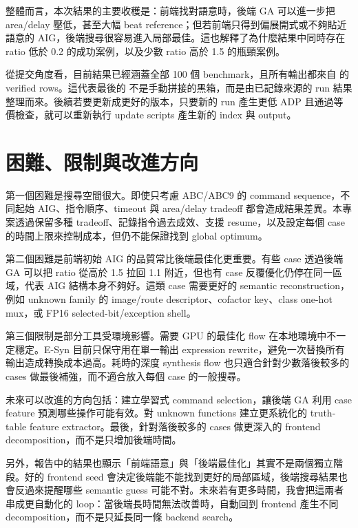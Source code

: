 \documentclass[UTF8,fontset=none,10pt,a4paper]{ctexart}
\newcommand{\code}[1]{\texttt{\detokenize{#1}}}
\begin{document}
整體而言，本次結果的主要收穫是：前端找對語意時，後端 GA 可以進一步把 area/delay 壓低，甚至大幅 beat reference；但若前端只得到偏展開式或不夠貼近語意的 AIG，後端搜尋很容易進入局部最佳。這也解釋了為什麼結果中同時存在 ratio 低於 0.2 的成功案例，以及少數 ratio 高於 1.5 的瓶頸案例。

從提交角度看，目前結果已經涵蓋全部 100 個 benchmark，且所有輸出都來自 \code{source_kind=run} 的 verified rows。這代表最後的 \code{output/} 不是手動拼接的黑箱，而是由已記錄來源的 run 結果整理而來。後續若要更新成更好的版本，只要新的 run 產生更低 ADP 且通過等價檢查，就可以重新執行 update scripts 產生新的 index 與 output。

\section{困難、限制與改進方向}

第一個困難是搜尋空間很大。即使只考慮 ABC/ABC9 的 command sequence，不同起始 AIG、指令順序、timeout 與 area/delay tradeoff 都會造成結果差異。本專案透過保留多種 tradeoff、記錄指令過去成效、支援 resume，以及設定每個 case 的時間上限來控制成本，但仍不能保證找到 global optimum。

第二個困難是前端初始 AIG 的品質常比後端最佳化更重要。有些 case 透過後端 GA 可以把 ratio 從高於 1.5 拉回 1.1 附近，但也有 case 反覆優化仍停在同一區域，代表 AIG 結構本身不夠好。這類 case 需要更好的 semantic reconstruction，例如 unknown family 的 image/route descriptor、cofactor key、class one-hot mux，或 FP16 selected-bit/exception shell。

第三個限制是部分工具受環境影響。需要 GPU 的最佳化 flow 在本地環境中不一定穩定。E-Syn 目前只保守用在單一輸出 expression rewrite，避免一次替換所有輸出造成轉換成本過高。耗時的深度 synthesis flow 也只適合針對少數落後較多的 cases 做最後補強，而不適合放入每個 case 的一般搜尋。

未來可以改進的方向包括：建立學習式 command selection，讓後端 GA 利用 case feature 預測哪些操作可能有效。對 unknown functions 建立更系統化的 truth-table feature extractor。最後，針對落後較多的 cases 做更深入的 frontend decomposition，而不是只增加後端時間。

另外，報告中的結果也顯示「前端語意」與「後端最佳化」其實不是兩個獨立階段。好的 frontend seed 會決定後端能不能找到更好的局部區域，後端搜尋結果也會反過來提醒哪些 semantic guess 可能不對。未來若有更多時間，我會把這兩者串成更自動化的 loop：當後端長時間無法改善時，自動回到 frontend 產生不同 decomposition，而不是只延長同一條 backend search。
\end{document}
